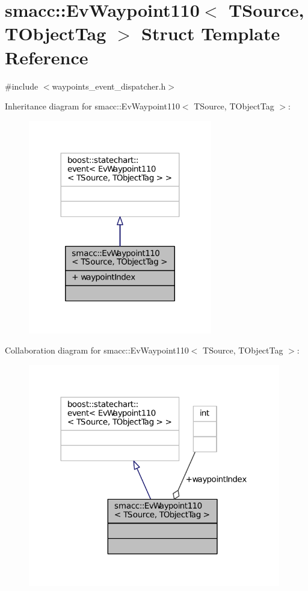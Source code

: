 \hypertarget{structsmacc_1_1EvWaypoint110}{}\section{smacc\+:\+:Ev\+Waypoint110$<$ T\+Source, T\+Object\+Tag $>$ Struct Template Reference}
\label{structsmacc_1_1EvWaypoint110}


{\ttfamily \#include $<$waypoints\+\_\+event\+\_\+dispatcher.\+h$>$}



Inheritance diagram for smacc\+:\+:Ev\+Waypoint110$<$ T\+Source, T\+Object\+Tag $>$\+:
\nopagebreak
\begin{figure}[H]
\begin{center}
\leavevmode
\includegraphics[width=227pt]{structsmacc_1_1EvWaypoint110__inherit__graph}
\end{center}
\end{figure}


Collaboration diagram for smacc\+:\+:Ev\+Waypoint110$<$ T\+Source, T\+Object\+Tag $>$\+:
\nopagebreak
\begin{figure}[H]
\begin{center}
\leavevmode
\includegraphics[width=312pt]{structsmacc_1_1EvWaypoint110__coll__graph}
\end{center}
\end{figure}
